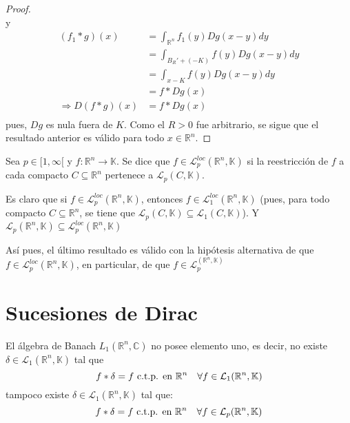 \documentclass[12pt]{report}
\theoremstyle{largebreak}
\newcommand\cf[3]{\ensuremath{#1:#2\rightarrow#3}}
\begin{document}
\begin{proof}
\begin{equation*}
        \end{equation*}
        y
        \begin{equation*}
            \begin{split}
                (f_1*g)(x)&=\int_{\mathbb{R}^n}f_1(y)Dg(x-y)dy\\
                &=\int_{ B_R'+(-K)}f(y)Dg(x-y)dy\\
                &=\int_{ x-K}f(y)Dg(x-y)dy\\
                &=f*Dg(x)\\
                \Rightarrow D(f*g)(x)&=f*Dg(x)\\
            \end{split}
        \end{equation*}
        pues, $Dg$ es nula fuera de $K$. Como el $R>0$ fue arbitrario, se sigue que el resultado anterior es válido para todo $x\in\mathbb{R}^n$.
    \end{proof}

    \begin{mydef}
        Sea $p\in[1,\infty[$ y $\cf{f}{\mathbb{R}^n}{\mathbb{K}}$. Se dice que $f\in\mathcal{L}_p^{loc}(\mathbb{R}^n,\mathbb{K})$ si la reestricción de $f$ a cada compacto $C\subseteq\mathbb{R}^n$ pertenece a $\mathcal{L}_p(C,\mathbb{K})$.
    \end{mydef}

    \begin{obs}
        Es claro que si $f\in\mathcal{L}_p^{loc}(\mathbb{R}^n,\mathbb{K})$, entonces $f\in \mathcal{L}_1^{loc}(\mathbb{R}^n,\mathbb{K})$ (pues, para todo compacto $C\subseteq\mathbb{R}^n$, se tiene que $\mathcal{L}_p(C,\mathbb{K})\subseteq\mathcal{L}_1(C,\mathbb{K})$). Y $\mathcal{L}_p(\mathbb{R}^n,\mathbb{K})\subseteq\mathcal{L}_p^{loc}(\mathbb{R}^n,\mathbb{K})$

        Así pues, el último resultado es válido con la hipótesis alternativa de que $f\in\mathcal{L}_p^{loc}(\mathbb{R}^n,\mathbb{K})$, en particular, de que $f\in\mathcal{L}_p^(\mathbb{R}^n,\mathbb{K})$
    \end{obs}

    \section{Sucesiones de Dirac}

    El álgebra de Banach $L_1(\mathbb{R}^n,\mathbb{C})$ no posee elemento uno, es decir, no existe $\delta\in\mathcal{L}_1(\mathbb{R}^n,\mathbb{K})$ tal que
    \begin{equation*}
        f*\delta=f\textup{ c.t.p. en }\mathbb{R}^n\quad\forall f\in\mathcal{L}_1(\mathbb{R}^n,\mathbb{K})
    \end{equation*}
    tampoco existe $\delta\in\mathcal{L}_1(\mathbb{R}^n,\mathbb{K})$ tal que:
    \begin{equation*}
        f*\delta=f\textup{ c.t.p. en }\mathbb{R}^n\quad\forall f\in\mathcal{L}_p(\mathbb{R}^n,\mathbb{K})
    \end{equation*}
\end{document}
